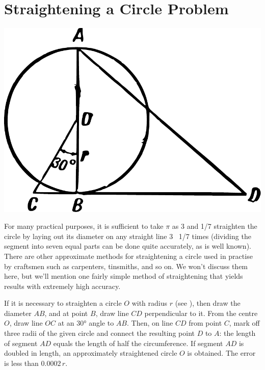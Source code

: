 \section{Straightening a Circle Problem}
\label{sec-9.5}

\begin{marginfigure}
\centering
\includegraphics[width=\textwidth]{figures/ch-09/fig-125.pdf}
\end{marginfigure}

For many practical purposes, it is sufficient to take $\pi$ as 3 and  1/7 straighten the circle by laying out its diameter on any straight line 3 \, 1/7 times (dividing the segment into seven equal parts can be done quite accurately, as is well known). There are other approximate methods for straightening a circle used in practise by craftsmen such as carpenters, tinsmiths, and so on. We won't discuss them here, but we'll mention one fairly simple method of straightening that yields results with extremely high accuracy.



If it is necessary to straighten a circle $O$ with radius $r$ (see ), then draw the diameter $AB$, and at point $B$, draw line $CD$ perpendicular to it. From the centre $O$, draw line $OC$ at an \ang{30} angle to $AB$. Then, on line $CD$ from point $C$, mark off three radii of the given circle and connect the resulting point $D$ to $A$: the length of segment $AD$ equals the length of half the circumference. If segment $AD$ is doubled in length, an approximately straightened circle $O$ is obtained. The error is less than $0.0002\, r$.

